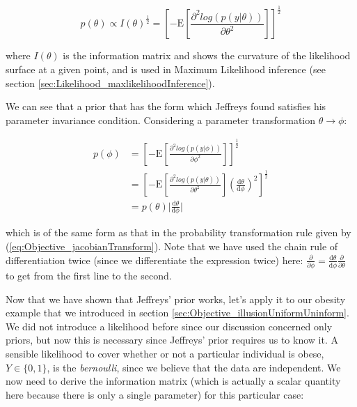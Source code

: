 \documentclass[11pt,fullpage]{book}
\begin{document}
\begin{equation}\label{eq:Objective_jeffreysPrior}
p(\theta)\propto I(\theta)^{\frac{1}{2}} = \left[-\mathrm{E}\left[\frac{\partial^2 log(p(y|\theta))}{\partial \theta^2}\right]\right]^{\frac{1}{2}}
\end{equation}

where $I(\theta)$ is the information matrix and shows the curvature of the likelihood surface at a given point, and is used in Maximum Likelihood inference (see section \ref{sec:Likelihood_maxlikelihoodInference}). 

We can see that a prior that has the form which Jeffreys found satisfies his parameter invariance condition. Considering a parameter transformation $\theta\rightarrow\phi$:

\begin{align}
p(\phi) &= \left[-\mathrm{E}\left[\frac{\partial^2 log(p(y|\phi))}{\partial \phi^2}\right]\right]^{\frac{1}{2}}\\
&= \left[-\mathrm{E}\left[\frac{\partial^2 log(p(y|\theta))}{\partial \theta^2}\right]\left(\frac{\mathrm{d}\theta}{\mathrm{d}\phi}\right)^2\right]^{\frac{1}{2}}\\
&= p(\theta) \lvert\frac{\mathrm{d}\theta}{\mathrm{d}\phi}\lvert
\end{align}

which is of the same form as that in the probability transformation rule given by (\ref{eq:Objective_jacobianTransform}). Note that we have used the chain rule of differentiation twice (since we differentiate the expression twice) here: $\frac{\partial}{\partial\phi} = \frac{\mathrm{d}\theta}{\mathrm{d}\phi} \frac{\partial}{\partial\theta}$ to get from the first line to the second.

Now that we have shown that Jeffreys' prior works, let's apply it to our obesity example that we introduced in section \ref{sec:Objective_illusionUniformUninform}. We did not introduce a likelihood before since our discussion concerned only priors, but now this is necessary since Jeffreys' prior requires us to know it. A sensible likelihood to cover whether or not a particular individual is obese, $Y\in\{0,1\}$, is the \textit{bernoulli}, since we believe that the data are independent. We now need to derive the information matrix (which is actually a scalar quantity here because there is only a single parameter) for this particular case:
\end{document}
